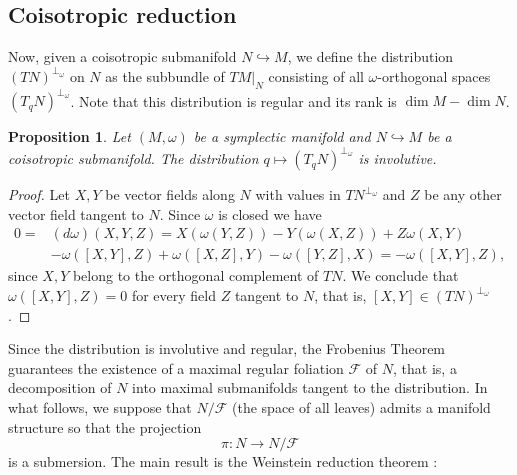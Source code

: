 \documentclass[12pt]{article}
\newtheorem{prop}{Proposition}[section]
\renewcommand{\dim}{\operatorname{dim}}
\begin{document}
\subsection{Coisotropic reduction}

Now, given a coisotropic submanifold $N \hookrightarrow M$, we define the distribution $(TN)^{\perp_\omega}$ on $N$ as
the subbundle of $TM |_N$ consisting of all $\omega$-orthogonal spaces $(T_qN)^{\perp_\omega}$. Note that this distribution is regular and its rank is $\dim M  - \dim N$.\\

\begin{prop} Let $(M, \omega)$ be a symplectic manifold and $N \hookrightarrow M$ be a coisotropic submanifold.  The  distribution $q \mapsto (T_qN)^{\perp_\omega}$ is involutive.
\end{prop}
\begin{proof} Let $X,Y$ be vector fields along $N$ with values in
$TN^{\perp_\omega}$ and $Z$ be any other vector field tangent to $N$. Since $\omega$ is closed we have \begin{align*} 0 =&
( d\omega)(X,Y,Z) = X(\omega(Y,Z)) - Y(\omega(X,Z)) + Z\omega(X,Y)\\ & - \omega([X,Y], Z) + \omega([X,Z], Y) - \omega([Y,Z],X) = -
\omega([X,Y],Z), \end{align*} since $X,Y$ belong to the orthogonal complement of $TN$. We conclude that $\omega([X,Y],Z) = 0$ for every field $Z$ tangent to $N$, that is, $[X,Y] \in (TN)^{\perp_\omega}$. \end{proof}

Since the distribution is involutive and regular, the Frobenius Theorem guarantees the existence of a maximal regular foliation $\mathcal{F}$ of $N$, that is, a decomposition of $N$ into maximal submanifolds tangent to the distribution. In what follows, we suppose that $N / \mathcal{F}$ (the space of all leaves) admits a manifold structure so that the projection $$\pi : N \rightarrow N / \mathcal{F}$$ is a submersion. The main result is the Weinstein reduction theorem \cites{weinstein1977lectures}:\\ 
\end{document}
